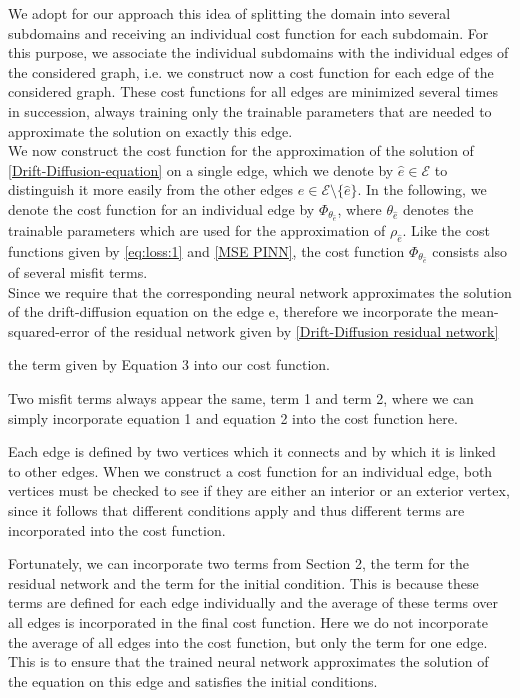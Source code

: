 We adopt for our approach this idea of splitting the domain into several subdomains and receiving an individual cost function for each subdomain. For this purpose, we associate the individual subdomains with the individual edges of the considered graph, i.e. we construct now a cost function for each edge of the considered graph. These cost functions for all edges are minimized several times in succession, always training only the trainable parameters that are needed to approximate the solution on exactly this edge.\\
We now construct the cost function for the approximation of the solution of \cref{Drift-Diffusion-equation} on a single edge, which we denote by $\hat{e} \in \mathcal{E}$ to distinguish it more easily from the other edges $e \in \mathcal{E} \setminus \{ \hat{e}\}$. In the following, we denote the cost function for an individual edge by $\Phi_{\theta_{\hat{e}}}$, where $\theta_{\hat{e}}$ denotes the trainable parameters which are used for the approximation of $\rho_{\hat{e}}$. Like the cost functions given by \cref{eq:loss:1} and \cref{MSE PINN}, the cost function $\Phi_{\theta_{\hat{e}}}$ consists also of several misfit terms. \\
Since we require that the corresponding neural network approximates the solution of the drift-diffusion equation on the edge e, therefore we incorporate the mean-squared-error of the residual network given by \cref{Drift-Diffusion residual network}

the term given by Equation 3 into our cost function.  

Two misfit terms always appear the same, term 1 and term 2, where we can simply incorporate equation 1 and equation 2 into the cost function here. 

Each edge is defined by two vertices which it connects and by which it is linked to other edges. When we construct a cost function for an individual edge, both vertices must be checked to see if they are either an interior or an exterior vertex, since it follows that different conditions apply and thus different terms are incorporated into the cost function. 

Fortunately, we can incorporate two terms from Section 2, the term for the residual network and the term for the initial condition. This is because these terms are defined for each edge individually and the average of these terms over all edges is incorporated in the final cost function. Here we do not incorporate the average of all edges into the cost function, but only the term for one edge. This is to ensure that the trained neural network approximates the solution of the equation on this edge and satisfies the initial conditions.  \\

